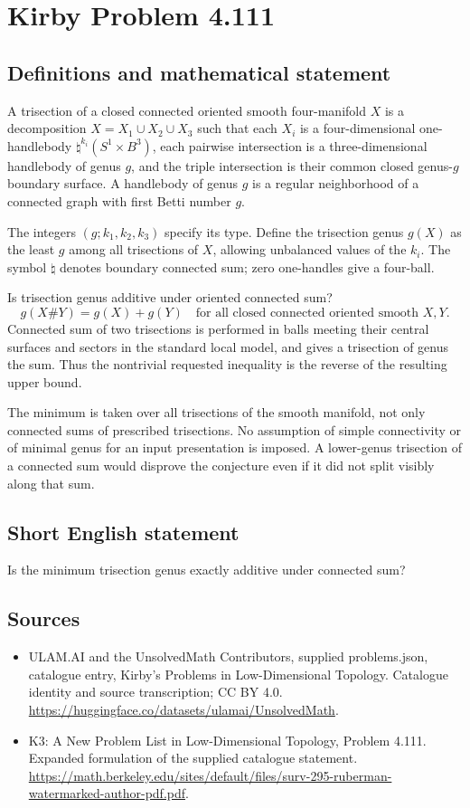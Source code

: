 \documentclass[11pt,a4paper]{article}
\begin{document}
\section*{Kirby Problem 4.111}\label{statement}

\subsection{Definitions and mathematical statement}
A trisection of a closed connected oriented smooth four-manifold $X$ is a decomposition $X=X_1\cup X_2\cup X_3$ such that each $X_i$ is a four-dimensional one-handlebody $\natural^{k_i}(S^1\times B^3)$, each pairwise intersection is a three-dimensional handlebody of genus $g$, and the triple intersection is their common closed genus-$g$ boundary surface. A handlebody of genus $g$ is a regular neighborhood of a connected graph with first Betti number $g$.

The integers $(g;k_1,k_2,k_3)$ specify its type. Define the trisection genus $g(X)$ as the least $g$ among all trisections of $X$, allowing unbalanced values of the $k_i$. The symbol $\natural$ denotes boundary connected sum; zero one-handles give a four-ball.

Is trisection genus additive under oriented connected sum?
\[
g(X\#Y)=g(X)+g(Y)
\quad\text{for all closed connected oriented smooth }X,Y.
\]
Connected sum of two trisections is performed in balls meeting their central surfaces and sectors in the standard local model, and gives a trisection of genus the sum. Thus the nontrivial requested inequality is the reverse of the resulting upper bound.

The minimum is taken over all trisections of the smooth manifold, not only connected sums of prescribed trisections. No assumption of simple connectivity or of minimal genus for an input presentation is imposed. A lower-genus trisection of a connected sum would disprove the conjecture even if it did not split visibly along that sum.
\subsection{Short English statement}
Is the minimum trisection genus exactly additive under connected sum?
\subsection{Sources}
\begin{itemize}
\item[S1] ULAM.AI and the UnsolvedMath Contributors, supplied problems.json, catalogue entry, Kirby's Problems in Low-Dimensional Topology. Catalogue identity and source transcription; CC BY 4.0.
\url{https://huggingface.co/datasets/ulamai/UnsolvedMath}.
\item[S2] K3: A New Problem List in Low-Dimensional Topology, Problem 4.111. Expanded formulation of the supplied catalogue statement.
\url{https://math.berkeley.edu/sites/default/files/surv-295-ruberman-watermarked-author-pdf.pdf}.
\end{itemize}
\end{document}
